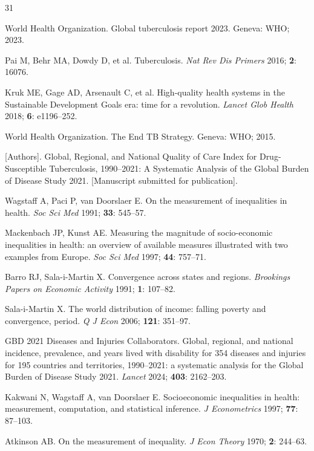 \documentclass[12pt]{article}
\begin{document}
\begin{thebibliography}{31}

World Health Organization. Global tuberculosis report 2023. Geneva: WHO; 2023.

Pai M, Behr MA, Dowdy D, et al. Tuberculosis. \textit{Nat Rev Dis Primers} 2016; \textbf{2}: 16076.

Kruk ME, Gage AD, Arsenault C, et al. High-quality health systems in the Sustainable Development Goals era: time for a revolution. \textit{Lancet Glob Health} 2018; \textbf{6}: e1196--252.

World Health Organization. The End TB Strategy. Geneva: WHO; 2015.

[Authors]. Global, Regional, and National Quality of Care Index for Drug-Susceptible Tuberculosis, 1990--2021: A Systematic Analysis of the Global Burden of Disease Study 2021. [Manuscript submitted for publication].

Wagstaff A, Paci P, van Doorslaer E. On the measurement of inequalities in health. \textit{Soc Sci Med} 1991; \textbf{33}: 545--57.

Mackenbach JP, Kunst AE. Measuring the magnitude of socio-economic inequalities in health: an overview of available measures illustrated with two examples from Europe. \textit{Soc Sci Med} 1997; \textbf{44}: 757--71.

Barro RJ, Sala-i-Martin X. Convergence across states and regions. \textit{Brookings Papers on Economic Activity} 1991; \textbf{1}: 107--82.

Sala-i-Martin X. The world distribution of income: falling poverty and convergence, period. \textit{Q J Econ} 2006; \textbf{121}: 351--97.

GBD 2021 Diseases and Injuries Collaborators. Global, regional, and national incidence, prevalence, and years lived with disability for 354 diseases and injuries for 195 countries and territories, 1990--2021: a systematic analysis for the Global Burden of Disease Study 2021. \textit{Lancet} 2024; \textbf{403}: 2162--203.

Kakwani N, Wagstaff A, van Doorslaer E. Socioeconomic inequalities in health: measurement, computation, and statistical inference. \textit{J Econometrics} 1997; \textbf{77}: 87--103.

Atkinson AB. On the measurement of inequality. \textit{J Econ Theory} 1970; \textbf{2}: 244--63.


\end{thebibliography}
\end{document}
